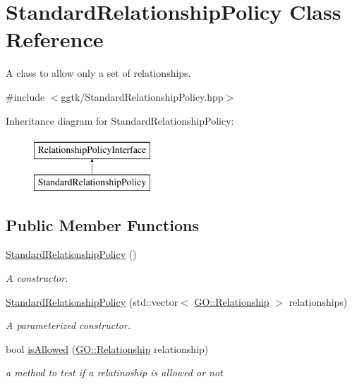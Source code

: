 \hypertarget{classStandardRelationshipPolicy}{}\section{Standard\+Relationship\+Policy Class Reference}
\label{classStandardRelationshipPolicy}


A class to allow only a set of relationships.  




{\ttfamily \#include $<$ggtk/\+Standard\+Relationship\+Policy.\+hpp$>$}

Inheritance diagram for Standard\+Relationship\+Policy\+:\begin{figure}[H]
\begin{center}
\leavevmode
\includegraphics[height=2.000000cm]{classStandardRelationshipPolicy}
\end{center}
\end{figure}
\subsection*{Public Member Functions}
\begin{DoxyCompactItemize}
\item 
\hyperlink{classStandardRelationshipPolicy_a8998d51c3752dfcde0b8931607178c4d}{Standard\+Relationship\+Policy} ()
\begin{DoxyCompactList}\small\item\em A constructor. \end{DoxyCompactList}\item 
\hyperlink{classStandardRelationshipPolicy_af23f42bba1feb00a3b22a96ae17ffacf}{Standard\+Relationship\+Policy} (std\+::vector$<$ \hyperlink{namespaceGO_aaa3905b2e000a8be411da8038827f993}{G\+O\+::\+Relationship} $>$ relationships)
\begin{DoxyCompactList}\small\item\em A parameterized constructor. \end{DoxyCompactList}\item 
bool \hyperlink{classStandardRelationshipPolicy_a75acddf7f5106cacf58f74bd837b03e4}{is\+Allowed} (\hyperlink{namespaceGO_aaa3905b2e000a8be411da8038827f993}{G\+O\+::\+Relationship} relationship)
\begin{DoxyCompactList}\small\item\em a method to test if a relatinoship is allowed or not \end{DoxyCompactList}\end{DoxyCompactItemize}



